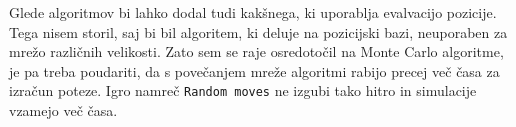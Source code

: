 \documentclass{article}
\begin{document}
Glede algoritmov bi lahko dodal tudi kakšnega, ki uporablja evalvacijo pozicije. Tega nisem storil, saj bi bil algoritem, ki deluje na pozicijski bazi, neuporaben za mrežo različnih velikosti. Zato sem se raje osredotočil na Monte Carlo algoritme, je pa treba poudariti, da s povečanjem mreže algoritmi rabijo precej več časa za izračun poteze. Igro namreč \texttt{Random moves} ne izgubi tako hitro in simulacije vzamejo več časa.



\end{document}
